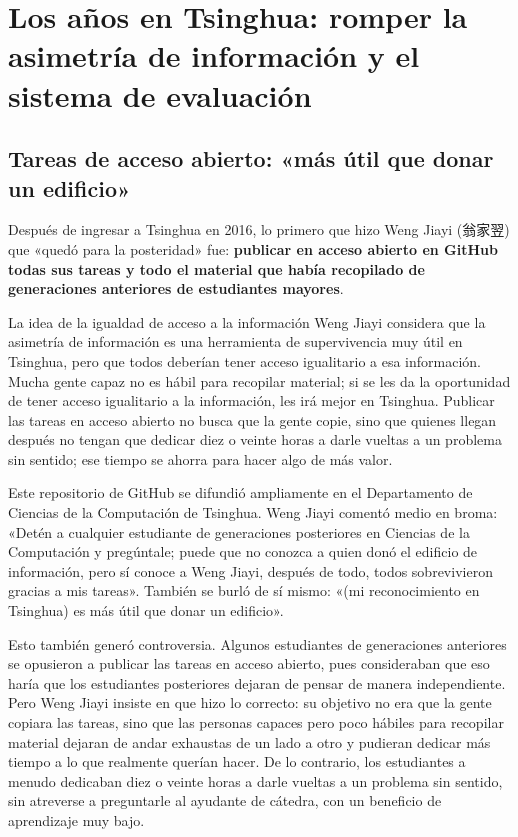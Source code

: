 \documentclass[a4paper]{article}
\begin{document}
\section{Los años en Tsinghua: romper la asimetría de información y el sistema de evaluación}

\subsection{Tareas de acceso abierto: «más útil que donar un edificio»}

Después de ingresar a Tsinghua en 2016, lo primero que hizo Weng Jiayi (翁家翌) que «quedó para la posteridad» fue: \textbf{publicar en acceso abierto en GitHub todas sus tareas y todo el material que había recopilado de generaciones anteriores de estudiantes mayores}.

\begin{importantbox}{La idea de la igualdad de acceso a la información}
Weng Jiayi considera que la asimetría de información es una herramienta de supervivencia muy útil en Tsinghua, pero que todos deberían tener acceso igualitario a esa información. Mucha gente capaz no es hábil para recopilar material; si se les da la oportunidad de tener acceso igualitario a la información, les irá mejor en Tsinghua. Publicar las tareas en acceso abierto no busca que la gente copie, sino que quienes llegan después no tengan que dedicar diez o veinte horas a darle vueltas a un problema sin sentido; ese tiempo se ahorra para hacer algo de más valor.
\end{importantbox}

Este repositorio de GitHub se difundió ampliamente en el Departamento de Ciencias de la Computación de Tsinghua. Weng Jiayi comentó medio en broma: «Detén a cualquier estudiante de generaciones posteriores en Ciencias de la Computación y pregúntale; puede que no conozca a quien donó el edificio de información, pero sí conoce a Weng Jiayi, después de todo, todos sobrevivieron gracias a mis tareas». También se burló de sí mismo: «(mi reconocimiento en Tsinghua) es más útil que donar un edificio».

Esto también generó controversia. Algunos estudiantes de generaciones anteriores se opusieron a publicar las tareas en acceso abierto, pues consideraban que eso haría que los estudiantes posteriores dejaran de pensar de manera independiente. Pero Weng Jiayi insiste en que hizo lo correcto: su objetivo no era que la gente copiara las tareas, sino que las personas capaces pero poco hábiles para recopilar material dejaran de andar exhaustas de un lado a otro y pudieran dedicar más tiempo a lo que realmente querían hacer. De lo contrario, los estudiantes a menudo dedicaban diez o veinte horas a darle vueltas a un problema sin sentido, sin atreverse a preguntarle al ayudante de cátedra, con un beneficio de aprendizaje muy bajo.
\end{document}
